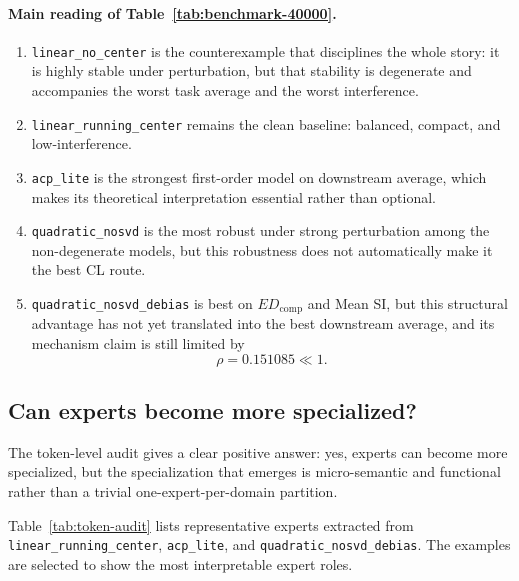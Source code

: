 \documentclass[11pt]{article}
\begin{document}
\paragraph{Main reading of Table~\ref{tab:benchmark-40000}.}
\begin{enumerate}
    \item \texttt{linear\_no\_center} is the counterexample that disciplines the whole story: it is highly stable under perturbation, but that stability is degenerate and accompanies the worst task average and the worst interference.
    \item \texttt{linear\_running\_center} remains the clean baseline: balanced, compact, and low-interference.
    \item \texttt{acp\_lite} is the strongest first-order model on downstream average, which makes its theoretical interpretation essential rather than optional.
    \item \texttt{quadratic\_nosvd} is the most robust under strong perturbation among the non-degenerate models, but this robustness does not automatically make it the best CL route.
    \item \texttt{quadratic\_nosvd\_debias} is best on $ED_{\mathrm{comp}}$ and Mean SI, but this structural advantage has not yet translated into the best downstream average, and its mechanism claim is still limited by
    \[
    \rho = 0.151085 \ll 1.
    \]
\end{enumerate}

\subsection{Can experts become more specialized?}

The token-level audit gives a clear positive answer: yes, experts can become more specialized, but the specialization that emerges is micro-semantic and functional rather than a trivial one-expert-per-domain partition.

Table~\ref{tab:token-audit} lists representative experts extracted from \texttt{linear\_running\_center}, \texttt{acp\_lite}, and \texttt{quadratic\_nosvd\_debias}. The examples are selected to show the most interpretable expert roles.
\end{document}
